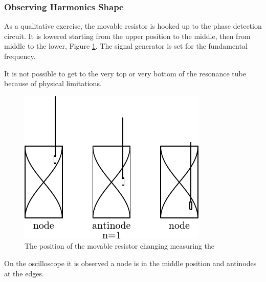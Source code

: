 \subsubsection{Observing Harmonics Shape}
As a qualitative exercise,
the movable resistor is hooked up to the phase detection circuit.
It is lowered starting from the upper position to the middle, then
from middle to the lower, Figure \ref{fig:variableresistormovement}.
The signal generator is set for the fundamental frequency.

It is not possible to get to the very top or very bottom of the resonance tube
because of physical limitations.

\begin{figure}[htb]
\centering
\includegraphics{pics/variableresistormovement.pdf}
\caption{The position of the movable resistor changing measuring
the \label{fig:variableresistormovement}}
\end{figure}

On the oscilloscope it is observed a node is in the
middle position and antinodes at the edges.


